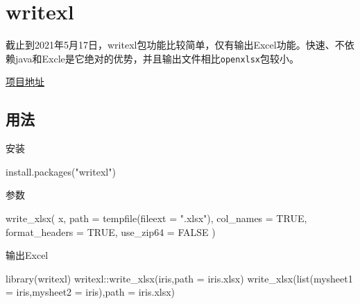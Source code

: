 \documentclass[
]{book}
\newenvironment{Shaded}{\begin{snugshade}}{\end{snugshade}}
\newcommand{\AttributeTok}[1]{\textcolor[rgb]{0.77,0.63,0.00}{#1}}
\newcommand{\ConstantTok}[1]{\textcolor[rgb]{0.00,0.00,0.00}{#1}}
\newcommand{\FunctionTok}[1]{\textcolor[rgb]{0.00,0.00,0.00}{#1}}
\newcommand{\NormalTok}[1]{#1}
\newcommand{\SpecialCharTok}[1]{\textcolor[rgb]{0.00,0.00,0.00}{#1}}
\newcommand{\StringTok}[1]{\textcolor[rgb]{0.31,0.60,0.02}{#1}}
\begin{document}
\hypertarget{data:writexl}{%
\section{writexl}\label{data:writexl}}

截止到2021年5月17日，writexl包功能比较简单，仅有输出Excel功能。快速、不依赖java和Excle是它绝对的优势，并且输出文件相比\texttt{openxlsx}包较小。

\href{https://docs.ropensci.org/writexl/}{项目地址}

\hypertarget{ux7528ux6cd5-1}{%
\subsection{用法}\label{ux7528ux6cd5-1}}

安装

\begin{Shaded}
\begin{Highlighting}[]
\FunctionTok{install.packages}\NormalTok{(}\StringTok{"writexl"}\NormalTok{)}
\end{Highlighting}
\end{Shaded}

参数

\begin{Shaded}
\begin{Highlighting}[]
\FunctionTok{write\_xlsx}\NormalTok{(}
\NormalTok{  x,}
  \AttributeTok{path =} \FunctionTok{tempfile}\NormalTok{(}\AttributeTok{fileext =} \StringTok{".xlsx"}\NormalTok{),}
  \AttributeTok{col\_names =} \ConstantTok{TRUE}\NormalTok{,}
  \AttributeTok{format\_headers =} \ConstantTok{TRUE}\NormalTok{,}
  \AttributeTok{use\_zip64 =} \ConstantTok{FALSE}
\NormalTok{)}
\end{Highlighting}
\end{Shaded}

输出Excel

\begin{Shaded}
\begin{Highlighting}[]
\FunctionTok{library}\NormalTok{(writexl)}
\NormalTok{writexl}\SpecialCharTok{::}\FunctionTok{write\_xlsx}\NormalTok{(iris,}\AttributeTok{path =} \StringTok{\textquotesingle{}iris.xlsx\textquotesingle{}}\NormalTok{)}
\FunctionTok{write\_xlsx}\NormalTok{(}\FunctionTok{list}\NormalTok{(}\AttributeTok{mysheet1 =}\NormalTok{ iris,}\AttributeTok{mysheet2 =}\NormalTok{ iris),}\AttributeTok{path =} \StringTok{\textquotesingle{}iris.xlsx\textquotesingle{}}\NormalTok{)}
\end{Highlighting}
\end{Shaded}
\end{document}
